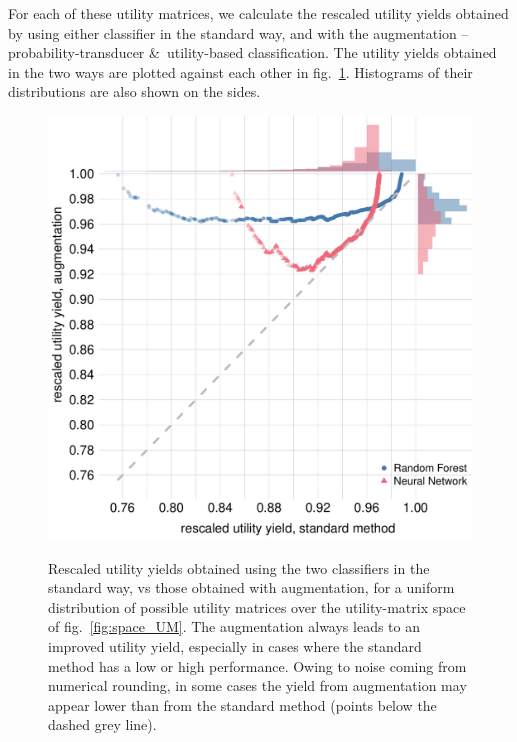 \documentclass[\ifafour a4paper,12pt,\else a5paper,10pt,\fi%
onecolumn,oneside,article,%
british%
]{memoir}
\theoremstyle{remark}
\theoremstyle{innote}
\newcommand*{\amp}{\&}
\renewcommand*{\|}[1][]{\nonscript\:#1\vert\nonscript\:\mathopen{}}
\newcommand*{\fig}{fig.}%
\begin{document}
For each of these utility matrices, we calculate the rescaled utility yields obtained by using either classifier in the standard way, and with the augmentation -- probability-transducer \amp\ utility-based classification. The utility yields obtained in the two ways are plotted against each other in \fig~\ref{fig:RF_gain_UMspace}. Histograms of their distributions are also shown on the sides. %
\begin{figure}[t]
  \centering
  \includegraphics[width=\linewidth]{RFCNN_transducer_gains_histograms.pdf}\\
  \caption{Rescaled utility yields obtained using the two classifiers in the standard way, vs those obtained with augmentation, for a uniform distribution of possible utility matrices over the utility-matrix space of \fig~\ref{fig:space_UM}. The augmentation always leads to an improved utility yield, especially in cases where the standard method has a low or high performance. Owing to noise coming from numerical rounding, in some cases the yield from augmentation may appear lower than from the standard method (points below the dashed grey line).}
  \label{fig:RF_gain_UMspace}
\end{figure}
\end{document}
